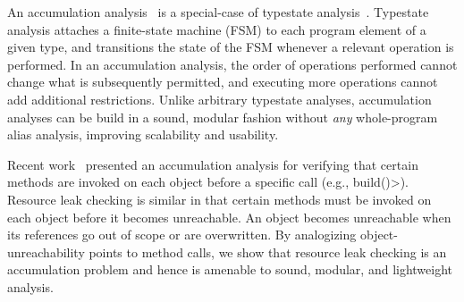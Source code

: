 An accumulation analysis~\cite{KelloggRSSE2020}
is a special-case of typestate analysis~\cite{StromY86}.
Typestate analysis attaches a finite-state machine (FSM)
to each program element of a given type, and transitions the state of the
FSM whenever a relevant operation is performed.
In an accumulation analysis,
the order of operations performed cannot change what is subsequently
permitted, and executing more operations cannot add additional
restrictions.  Unlike arbitrary typestate analyses, accumulation analyses can
be build in a sound, modular fashion without \emph{any} whole-program alias
analysis, improving scalability and usability.

Recent work~\cite{KelloggRSSE2020} presented an accumulation analysis for
verifying that certain methods are invoked on each object
before a specific call (e.g., \<build()>).
Resource leak checking is similar in that certain methods must be invoked
on each object before it becomes unreachable.
An object becomes unreachable when its references go out
of scope or are overwritten.
By analogizing object-unreachability points to
method calls, we show that resource leak checking is an accumulation
problem and hence is amenable to sound, modular, and lightweight analysis.


